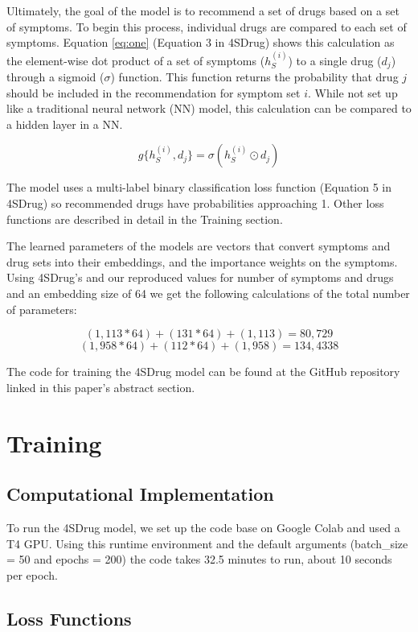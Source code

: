 \documentclass[letterpaper]{article} %
\begin{document}
Ultimately, the goal of the model is to recommend a set of drugs based on a set of symptoms. To begin this process, individual drugs are compared to each set of symptoms. Equation \ref{eq:one} (Equation 3 in 4SDrug) shows this calculation as the element-wise dot product of a set of symptoms ($h_S^{(i)}$) to a single drug ($d_j$) through a sigmoid ($\sigma$) function. This function returns the probability that drug $j$ should be included in the recommendation for symptom set $i$. While not set up like a traditional neural network (NN) model, this calculation can be compared to a hidden layer in a NN.

\begin{equation}
    g\{h_S^{(i)},d_j\} = \sigma(h_S^{(i)} \odot d_j)
    \label{eq:one}
\end{equation}

The model uses a multi-label binary classification loss function (Equation 5 in 4SDrug) so recommended drugs have probabilities approaching 1. Other loss functions are described in detail in the Training section.

The learned parameters of the models are vectors that convert symptoms and drug sets into their embeddings, and the importance weights on the symptoms. Using 4SDrug's and our reproduced values for number of symptoms and drugs and an embedding size of 64 we get the following calculations of the total number of parameters:

$$(1,113*64) + (131*64) + (1,113) = 80,729$$
$$(1,958*64) + (112*64) + (1,958) = 134,4338$$

The code for training the 4SDrug model can be found at the GitHub repository linked in this paper's abstract section.

\section{Training}
\subsection{Computational Implementation}
To run the 4SDrug model, we set up the code base on Google Colab and used a T4 GPU. Using this runtime environment and the default arguments (batch\_size = 50 and epochs = 200) the code takes 32.5 minutes to run, about 10 seconds per epoch. 

\subsection{Loss Functions}
\end{document}
